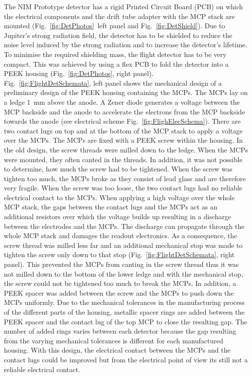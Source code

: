 	The NIM Prototype detector has a rigid Printed Circuit Board (PCB) on which the electrical components and the drift tube adapter with the MCP stack are mounted (Fig.~\ref{fig:DetPhotos}~left panel and Fig.~\ref{fig:DetShield}). Due to Jupiter's strong radiation field, the detector has to be shielded to reduce the noise level induced by the strong radiation and to increase the detector's lifetime. To minimise the required shielding mass, the flight detector has to be very compact. This was achieved by using a flex PCB to fold the detector into a PEEK housing (Fig.~\ref{fig:DetPhotos}, right panel).\\ Fig.~\ref{fig:FlightDetSchemata}, left panel shows the mechanical design of a preliminary design of the PEEK housing containing the MCPs. The MCPs lay on a ledge 1~mm above the anode. A Zener diode generates a voltage between the MCP backside and the anode to accelerate the electrons from the MCP backside towards the anode (see electrical scheme Fig.~\ref{fig:FlighElecSchema}). There are two contact lugs on top and at the bottom of the MCP stack to apply a voltage over the MCPs. The MCPs are fixed with a PEEK screw within the housing. In the old design, the screw threads were milled down to the ledge. When the MCPs were mounted, they often canted in the threads. In addition, it was not possible to determine, how much the screw had to be tightened. When the screw was tighten too much, the MCPs broke as they consist of lead glass and are therefore very fragile. When the screw was too loose, the two contact lugs had no reliable electrical contact to the MCPs. When applying a high voltage over the whole MCP stack, the gaps between the contact lugs and the MCPs act as an additional resistors over which the voltage builds up resulting in a discharge between the electrodes and the MCPs. The discharge can propagate through the whole MCP stack and damages the readout electronics. As a consequence, the screw thread was milled less far and an additional mechanical stop was made to tighten the screw only down to that stop (Fig.~\ref{fig:FlightDetSchemata}, right panel). This prevented the MCPs from canting in the screw thread thus it was not milled down to the bottom of the lower ledge and with the mechanical stop, the screw could not be tightened too much to break the MCPs. In addition, a PEEK spacer was added between the screw and the MCPs to push down the MCPs uniformly. Due to the mechanical tolerances in the manufacturing process of the different parts of the housing, metallic spacer rings are added between the PEEK spacer and the contact lug of the top MCP to close the resulting gap. The number of added rings varies between each detector because the gap resulting from the varying mechanical tolerances is different for each manufactured housing. With this design, the electrical contact between the MCPs and the contact lugs could be improved but from the electrical point of view its still not a reliable electrical contact.\\

